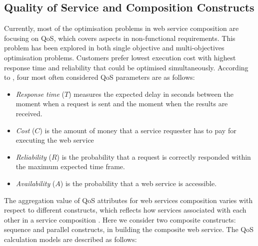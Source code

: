 \documentclass{llncs}
\begin{document}
\subsection{Quality of Service and Composition Constructs}\label{Quality of Service and Composition Constructs}
Currently, most of the optimisation problems \cite{feng2013dynamic,huang2009effective,ma2015hybrid,da2014graph} in web service composition are focusing on QoS, which covers aspects in non-functional requirements. This problem has been explored in both single objective and multi-objectives optimisation problems. Customers prefer lowest execution cost with highest response time and reliability that could be optimised simultaneously. According to \cite{zeng2003quality}, four most often considered QoS parameters are as follows:
\begin{itemize}
\item \textit{Response time} ($T$) measures the expected delay in seconds between the moment when a request is sent and the moment when the results are received.
\item \textit{Cost} ($C$) is the amount of money that a service requester has to pay for executing the web service
\item \textit{Reliability} ($R$) is the probability that a request is correctly responded within the maximum expected time frame.
\item \textit{Availability} ($A$) is the probability that a web service is accessible.
\end{itemize}
The aggregation value of QoS attributes for web services composition varies with respect to different constructs, which reflects how services associated with each other in a service composition \cite{zeng2003quality}. Here we consider two composite constructs: sequence and parallel constructs, in building the composite web service. The QoS calculation models are described as follows:
\end{document}
